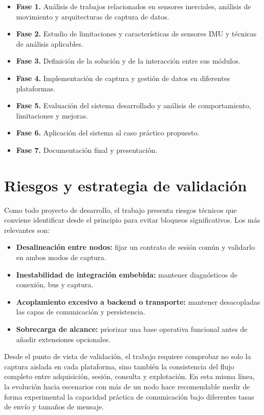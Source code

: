 \begin{itemize}
  \item \textbf{Fase 1.} Análisis de trabajos relacionados en sensores inerciales, análisis de movimiento y arquitecturas de captura de datos.
  \item \textbf{Fase 2.} Estudio de limitaciones y características de sensores IMU y técnicas de análisis aplicables.
  \item \textbf{Fase 3.} Definición de la solución y de la interacción entre sus módulos.
  \item \textbf{Fase 4.} Implementación de captura y gestión de datos en diferentes plataformas.
  \item \textbf{Fase 5.} Evaluación del sistema desarrollado y análisis de comportamiento, limitaciones y mejoras.
  \item \textbf{Fase 6.} Aplicación del sistema al caso práctico propuesto.
  \item \textbf{Fase 7.} Documentación final y presentación.
\end{itemize}

\section{Riesgos y estrategia de validación}

Como todo proyecto de desarrollo, el trabajo presenta riesgos técnicos que conviene identificar desde el principio para evitar bloqueos significativos. Los más relevantes son:

\begin{itemize}
  \item \textbf{Desalineación entre nodos:} fijar un contrato de sesión común y validarlo en ambos modos de captura.
  \item \textbf{Inestabilidad de integración embebida:} mantener diagnósticos de conexión, bus y captura.
  \item \textbf{Acoplamiento excesivo a backend o transporte:} mantener desacopladas las capas de comunicación y persistencia.
  \item \textbf{Sobrecarga de alcance:} priorizar una base operativa funcional antes de añadir extensiones opcionales.
\end{itemize}

Desde el punto de vista de validación, el trabajo requiere comprobar no solo la captura aislada en cada plataforma, sino también la consistencia del flujo completo entre adquisición, sesión, consulta y explotación. En esta misma línea, la evolución hacia escenarios con más de un nodo hace recomendable medir de forma experimental la capacidad práctica de comunicación bajo diferentes tasas de envío y tamaños de mensaje.

